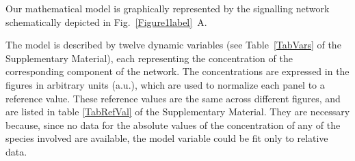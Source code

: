 \documentclass[oneside, 10pt, a4paper, twocolumn]{article}
\begin{document}
Our mathematical model is graphically represented by 
the signalling network schematically depicted in Fig.~\ref{Figure1label}~A. %

The model is described by twelve dynamic variables (see Table~\ref{TabVars} of the Supplementary Material), 
each representing the concentration of the corresponding component of the network. 
The concentrations are expressed in the figures in arbitrary units (a.u.), which are used to normalize each panel to a reference value. These reference values are the same across different figures, and are listed in table \ref{TabRefVal} of the Supplementary Material. They are necessary because, since no data for the absolute values of the concentration of any of the species involved are available, the model variable could be fit only to relative data.
\end{document}
